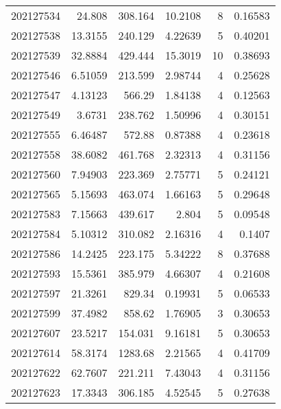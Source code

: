 \begin{tabular}{rrrrrr}
 202127534 &         24.808   &      308.164  &           10.2108  &           8 & 0.16583 \\
 202127538 &         13.3155  &      240.129  &            4.22639 &           5 & 0.40201 \\
 202127539 &         32.8884  &      429.444  &           15.3019  &          10 & 0.38693 \\
 202127546 &          6.51059 &      213.599  &            2.98744 &           4 & 0.25628 \\
 202127547 &          4.13123 &      566.29   &            1.84138 &           4 & 0.12563 \\
 202127549 &          3.6731  &      238.762  &            1.50996 &           4 & 0.30151 \\
 202127555 &          6.46487 &      572.88   &            0.87388 &           4 & 0.23618 \\
 202127558 &         38.6082  &      461.768  &            2.32313 &           4 & 0.31156 \\
 202127560 &          7.94903 &      223.369  &            2.75771 &           5 & 0.24121 \\
 202127565 &          5.15693 &      463.074  &            1.66163 &           5 & 0.29648 \\
 202127583 &          7.15663 &      439.617  &            2.804   &           5 & 0.09548 \\
 202127584 &          5.10312 &      310.082  &            2.16316 &           4 & 0.1407  \\
 202127586 &         14.2425  &      223.175  &            5.34222 &           8 & 0.37688 \\
 202127593 &         15.5361  &      385.979  &            4.66307 &           4 & 0.21608 \\
 202127597 &         21.3261  &      829.34   &            0.19931 &           5 & 0.06533 \\
 202127599 &         37.4982  &      858.62   &            1.76905 &           3 & 0.30653 \\
 202127607 &         23.5217  &      154.031  &            9.16181 &           5 & 0.30653 \\
 202127614 &         58.3174  &     1283.68   &            2.21565 &           4 & 0.41709 \\
 202127622 &         62.7607  &      221.211  &            7.43043 &           4 & 0.31156 \\
 202127623 &         17.3343  &      306.185  &            4.52545 &           5 & 0.27638 \\

\end{tabular}
